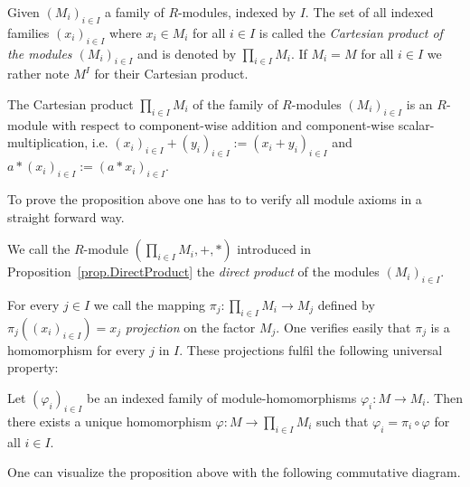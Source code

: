 Given $(M_i)_{i\in I}$ a family of $R$-modules, indexed by $I$. The set of all indexed families $(x_i)_{i\in I}$ where $x_i\in M_i$ for all $i\in I$ is called the \emph{Cartesian product of the modules $(M_i)_{i\in I}$} and is denoted by $\prod\limits_{i\in I} M_i$. If $M_i=M$ for all $i\in I$ we rather note $M^I$ for their Cartesian product.

\begin{prop}\label{prop.DirectProduct}
The Cartesian product $\prod_{i\in I} M_i$ of the family of $R$-modules $(M_i)_{i\in I}$ is an $R$-module with respect to component-wise addition and component-wise scalar-multiplication, i.e. $(x_i)_{i\in I}+(y_i)_{i\in I}:=(x_i+y_i)_{i\in I}$ and $a\ast(x_i)_{i\in I}:=(a\ast x_i)_{i\in I}$.
\end{prop}

To prove the proposition above one has to to verify all module axioms in a straight forward way.

\begin{defin}
We call the $R$-module $\left(\prod_{i\in I} M_i,+,\ast\right)$ introduced in Proposition~\ref{prop.DirectProduct} the \emph{direct product} of the modules $(M_i)_{i\in I}$.
\end{defin}

For every $j\in I$ we call the mapping $\pi_j\colon \prod_{i\in I} M_i\to M_j$ defined by $\pi_j((x_i)_{i\in I})=x_j$ \emph{projection} on the factor $M_j$. One verifies easily that $\pi_j$ is a homomorphism for every $j$ in $I$. These projections fulfil the following universal property:

\begin{prop}
Let $(\varphi_i)_{i\in I}$ be an indexed family of module-homomorphisms $\varphi_i\colon M\to M_i$. Then there exists a unique homomorphism $\varphi\colon M\to \prod_{i\in I} M_i$ such that $\varphi_i=\pi_i\circ\varphi$ for all $i\in I$.
\end{prop}

One can visualize the proposition above with the following commutative diagram.

\begin{center}
\end{center}

